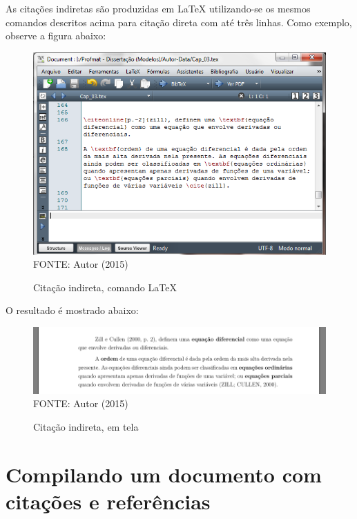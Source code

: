 As citações indiretas são produzidas em LaTeX utilizando-se os mesmos comandos descritos acima para citação direta com até três linhas. Como exemplo, observe a figura abaixo:
	\begin{figure}[H]
	\centering
	\caption{Citação indireta, comando LaTeX}
	\includegraphics[scale=0.45]
	{img/fig14.png}\label{fig14}\\
	FONTE: Autor (2015)
	\end{figure}

O resultado é mostrado abaixo:
	\begin{figure}[H]
	\centering
	\caption{Citação indireta, em tela}
	\includegraphics[scale=0.45]
	{img/fig15.png}\label{fig15}\\
	FONTE: Autor (2015)
	\end{figure}
	


\section{Compilando um documento com citações e referências}
 


